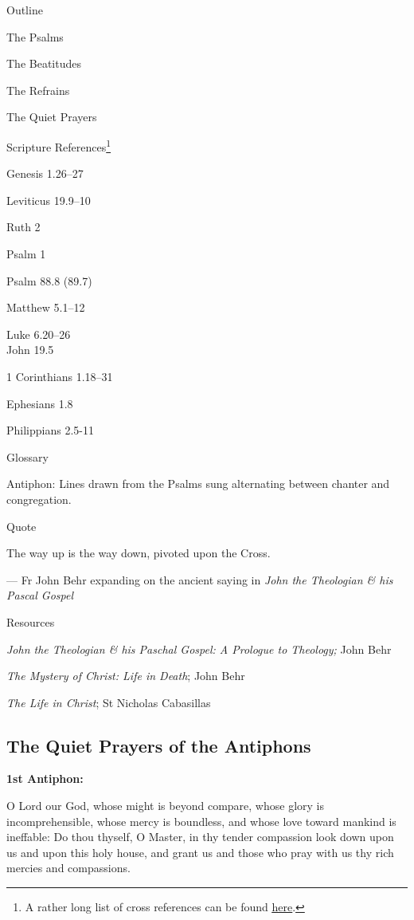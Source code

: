 \documentclass[
]{article}
\begin{document}
Outline

The Psalms

The Beatitudes

The Refrains

The Quiet Prayers

Scripture References\footnote{A rather long list of cross references can
  be found
  \href{http://jimmyakin.com/deuterocanonical-references-in-the-new-testament}{\ul{here}}.}

Genesis 1.26--27

Leviticus 19.9--10

Ruth 2

Psalm 1

Psalm 88.8 (89.7)

Matthew 5.1--12

Luke 6.20--26\\
John 19.5

1 Corinthians 1.18--31

Ephesians 1.8

Philippians 2.5-11

Glossary

Antiphon: Lines drawn from the Psalms sung alternating between chanter
and congregation.

Quote

The way up is the way down, pivoted upon the Cross.

--- Fr John Behr expanding on the ancient saying in \emph{John the
Theologian \& his Pascal Gospel}

Resources

\emph{John the Theologian \& his Paschal Gospel: A Prologue to
Theology;} John Behr

\emph{The Mystery of Christ: Life in Death}; John Behr

\emph{The Life in Christ}; St Nicholas Cabasillas

\subsection{\texorpdfstring{\textbf{The Quiet Prayers of the
Antiphons}}{The Quiet Prayers of the Antiphons}}\label{the-quiet-prayers-of-the-antiphons}

\textbf{1st Antiphon:}

O Lord our God, whose might is beyond compare, whose glory is
incomprehensible, whose mercy is boundless, and whose love toward
mankind is ineffable: Do thou thyself, O Master, in thy tender
compassion look down upon us and upon this holy house, and grant us and
those who pray with us thy rich mercies and compassions.
\end{document}
